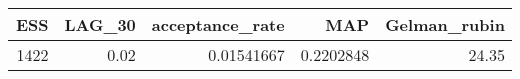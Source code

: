 \begin{longtable}{rrrrr}
\toprule
ESS & LAG\_30 & acceptance\_rate & MAP & Gelman\_rubin \\ 
\midrule
1422 & 0.02 & 0.01541667 & 0.2202848 & 24.35 \\ 
\bottomrule
\end{longtable}

